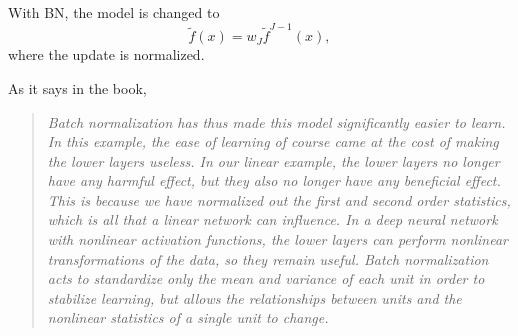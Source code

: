 With BN, the model is changed to
\begin{equation}
\tilde f(x) = w_J \tilde f^{J-1}(x),
\end{equation}
where the update is normalized.
%

As it says in the book,
\begin{quotation}
	\emph{
		Batch normalization has thus made this model significantly easier to learn. In this example, the ease of learning of course came at the cost of making the lower layers useless. In our linear example, the lower layers no longer have any harmful effect, but they also no longer have any beneficial effect. This is because we have normalized out the first and second order statistics, which is all that a linear network can influence. In a deep neural network with nonlinear activation functions, the lower layers can perform nonlinear transformations of the data, so they remain useful. Batch normalization acts to standardize only the mean and variance of each unit in order to stabilize learning, but allows the relationships between units and the nonlinear statistics of a single unit to change.}
\end{quotation}

%

%

